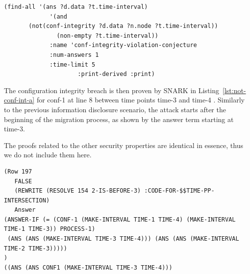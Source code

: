 \begin{lstlisting}[caption=SNARK question to detect the configuration integrity violation., label=lst:not-conf-int-q,captionpos=b] 
   (find-all '(ans ?d.data ?t.time-interval)
             '(and
       (not(conf-integrity ?d.data ?n.node ?t.time-interval))
               (non-empty ?t.time-interval))
             :name 'conf-integrity-violation-conjecture
             :num-answers 1
             :time-limit 5
                     :print-derived :print)
\end{lstlisting}

The configuration integrity breach is then proven by SNARK in Listing~\ref{lst:not-conf-int-a} for conf-1 at line 8 between time points time-3 and time-4 .
Similarly to the previous information disclosure scenario, the attack starts after the beginning of the migration process, as shown by the answer term starting at time-3.

The proofs related to the other security properties are identical in essence, thus we do not include them here.

\begin{lstlisting}[caption=SNARK detecting the configuration integrity violation., label=lst:not-conf-int-a,captionpos=b] 
(Row 197
   FALSE
   (REWRITE (RESOLVE 154 2-IS-BEFORE-3) :CODE-FOR-$$TIME-PP-INTERSECTION)
   Answer 
(ANSWER-IF (= (CONF-1 (MAKE-INTERVAL TIME-1 TIME-4) (MAKE-INTERVAL TIME-1 TIME-3)) PROCESS-1)
 (ANS (ANS (MAKE-INTERVAL TIME-3 TIME-4))) (ANS (ANS (MAKE-INTERVAL TIME-2 TIME-3)))))
)
((ANS (ANS CONF1 (MAKE-INTERVAL TIME-3 TIME-4)))

\end{lstlisting}

